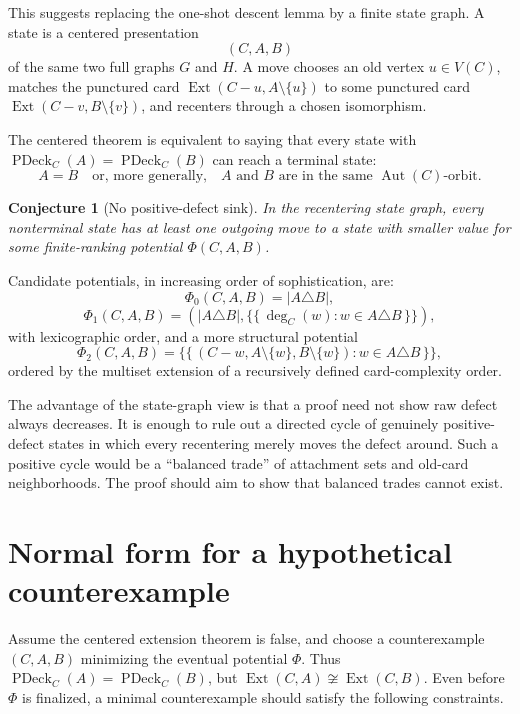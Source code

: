 \documentclass[11pt]{article}
\newtheorem{conjecture}{Conjecture}
\newcommand{\PDeck}{\operatorname{PDeck}}
\newcommand{\Ext}{\operatorname{Ext}}
\newcommand{\Aut}{\operatorname{Aut}}
\begin{document}
This suggests replacing the one-shot descent lemma by a finite state graph.
A state is a centered presentation
\[
  (C,A,B)
\]
of the same two full graphs \(G\) and \(H\).  A move chooses an old vertex
\(u\in V(C)\), matches the punctured card
\(\Ext(C-u,A\setminus\{u\})\) to some punctured card
\(\Ext(C-v,B\setminus\{v\})\), and recenters through a chosen isomorphism.

The centered theorem is equivalent to saying that every state with
\(\PDeck_C(A)=\PDeck_C(B)\) can reach a terminal state:
\[
  A=B
  \quad\text{or, more generally,}\quad
  A \text{ and } B \text{ are in the same } \Aut(C)\text{-orbit}.
\]

\begin{conjecture}[No positive-defect sink]
In the recentering state graph, every nonterminal state has at least one
outgoing move to a state with smaller value for some finite-ranking potential
\(\Phi(C,A,B)\).
\end{conjecture}

Candidate potentials, in increasing order of sophistication, are:
\[
  \Phi_0(C,A,B)=|A\triangle B|,
\]
\[
  \Phi_1(C,A,B)=
  \left(
    |A\triangle B|,
    \{\!\{\, \deg_C(w) : w\in A\triangle B \,\}\!\}
  \right),
\]
with lexicographic order, and a more structural potential
\[
  \Phi_2(C,A,B)=
  \{\!\{\, (C-w, A\setminus\{w\}, B\setminus\{w\}) :
      w\in A\triangle B \,\}\!\},
\]
ordered by the multiset extension of a recursively defined card-complexity
order.

The advantage of the state-graph view is that a proof need not show raw defect
always decreases.  It is enough to rule out a directed cycle of genuinely
positive-defect states in which every recentering merely moves the defect
around.  Such a positive cycle would be a ``balanced trade'' of attachment
sets and old-card neighborhoods.  The proof should aim to show that balanced
trades cannot exist.

\section{Normal form for a hypothetical counterexample}

Assume the centered extension theorem is false, and choose a counterexample
\((C,A,B)\) minimizing the eventual potential \(\Phi\).  Thus
\(\PDeck_C(A)=\PDeck_C(B)\), but
\(\Ext(C,A)\not\cong\Ext(C,B)\).  Even before \(\Phi\) is finalized, a
minimal counterexample should satisfy the following constraints.
\end{document}
